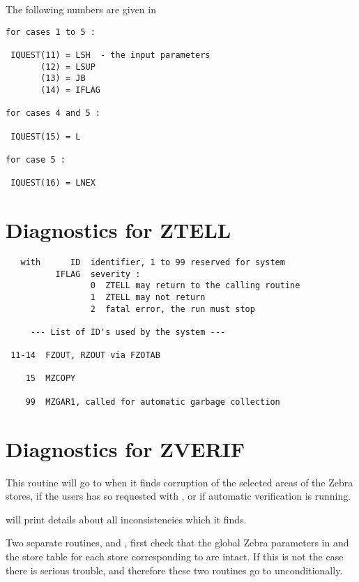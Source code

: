 The following numbers are given in 

\begin{verbatim}
for cases 1 to 5 :

 IQUEST(11) = LSH  - the input parameters
       (12) = LSUP
       (13) = JB
       (14) = IFLAG

for cases 4 and 5 :

 IQUEST(15) = L

for case 5 :

 IQUEST(16) = LNEX
\end{verbatim}

\section{Diagnostics for ZTELL}

\label{sec:diaztell}

\begin{verbatim}
   with      ID  identifier, 1 to 99 reserved for system
          IFLAG  severity :
                 0  ZTELL may return to the calling routine
                 1  ZTELL may not return
                 2  fatal error, the run must stop

     --- List of ID's used by the system ---

 11-14  FZOUT, RZOUT via FZOTAB

    15  MZCOPY

    99  MZGAR1, called for automatic garbage collection
\end{verbatim}

\section{Diagnostics for ZVERIF}


This routine will go to  when it finds corruption of
the selected areas of the Zebra stores, if the users has
so requested with , or if automatic verification
is running.

 will print details about all inconsistencies which it finds.

Two separate routines,  
and , first check that the global
Zebra parameters in  and the store table for each store
corresponding to  are intact.
If this is not the case there is serious trouble,
and therefore these two routines go to  unconditionally.
\endinput














